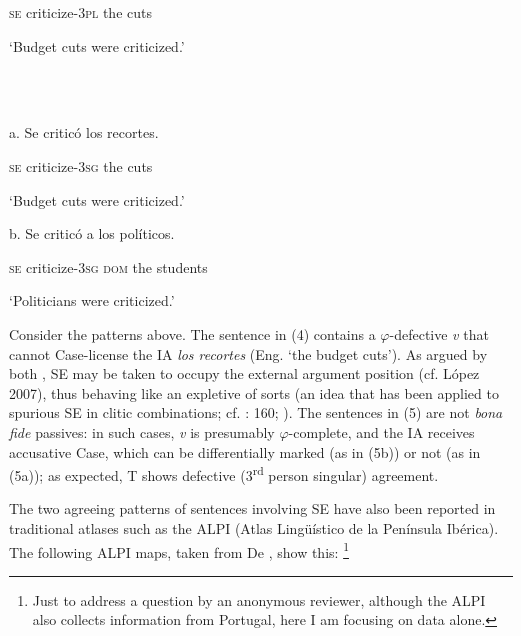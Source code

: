 \documentclass[output=paper]{langsci/langscibook}
\begin{document}
  \textsc{se} criticize-\textsc{3pl}  the cuts

           ‘Budget cuts were criticized.’

\ea%
    \label{ex:key:5}
    \gll\\
        \\
    \glt
    \z


a.  Se   criticó             los  recortes.      

        \textsc{se}  criticize-\textsc{3sg}  the  cuts

                  ‘Budget cuts were criticized.’

  b.   Se  criticó             a        los  políticos.           

      \textsc{se}  criticize-\textsc{3sg}  \textsc{dom} the students

      ‘Politicians were criticized.’

Consider the patterns above. The sentence in (4) contains a $\varphi $-defective \textit{v} that cannot Case-license the IA \textit{los recortes} (Eng. ‘the budget cuts’). As argued by both \citet{Raposo1996}, SE may be taken to occupy the external argument position (cf. López 2007), thus behaving like an expletive of sorts (an idea that has been applied to spurious SE in clitic combinations; cf. \citealt{Kayne2000}: 160; \citet{Gallego2017}). The sentences in (5) are not \textit{bona fide} passives: in such cases, \textit{v} is presumably $\varphi $-complete, and the IA receives accusative Case, which can be differentially marked (as in (5b)) or not (as in (5a)); as expected, T shows defective (3\textsuperscript{rd} person singular) agreement.

  The two agreeing patterns of sentences involving SE have also been reported in traditional atlases such as the ALPI (Atlas Lingüístico de la Península Ibérica). The following ALPI maps, taken from De \citet{Benito2010}, show this: \footnote{Just to address a question by an anonymous reviewer, although the ALPI also collects information from Portugal, here I am focusing on  data alone.} 
\end{document}
